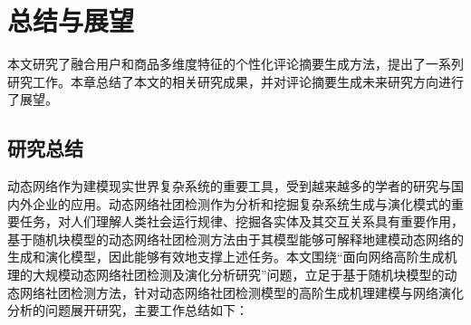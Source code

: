 %

\chapter{总结与展望}

\label{chap:8}


本文研究了融合用户和商品多维度特征的个性化评论摘要生成方法，提出了一系列研究工作。本章总结了本文的相关研究成果，并对评论摘要生成未来研究方向进行了展望。




\section{研究总结}

动态网络作为建模现实世界复杂系统的重要工具，受到越来越多的学者的研究与国内外企业的应用。动态网络社团检测作为分析和挖掘复杂系统生成与演化模式的重要任务，对人们理解人类社会运行规律、挖掘各实体及其交互关系具有重要作用，基于随机块模型的动态网络社团检测方法由于其模型能够可解释地建模动态网络的生成和演化模型，因此能够有效地支撑上述任务。本文围绕“面向网络高阶生成机理的大规模动态网络社团检测及演化分析研究”问题，立足于基于随机块模型的动态网络社团检测方法，针对动态网络社团检测模型的高阶生成机理建模与网络演化分析的问题展开研究，主要工作总结如下：

